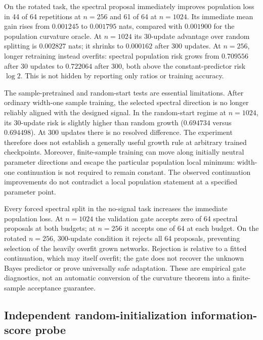 On the rotated task, the spectral proposal immediately improves population
loss in 44 of 64 repetitions at $n=256$ and 61 of 64 at $n=1024$. Its immediate
mean gain rises from $0.001245$ to $0.001795$ nats, compared with $0.001900$ for
the population curvature oracle. At $n=1024$ its 30-update advantage over random
splitting is $0.002827$ nats; it shrinks to $0.000162$ after 300 updates.
At $n=256$, longer retraining instead overfits: spectral population risk grows
from $0.709556$ after 30 updates to $0.722064$ after 300, both above the
constant-predictor risk $\log 2$. This is not hidden by reporting only ratios or
training accuracy.

The sample-pretrained and random-start tests are essential limitations.
After ordinary width-one sample training, the selected spectral direction is
no longer reliably aligned with the designed signal. In the random-start
regime at $n=1024$, its 30-update risk is slightly higher than random growth
($0.694734$ versus $0.694498$). At 300 updates there is no resolved difference.
The experiment therefore does not establish a generally useful growth rule at
arbitrary trained checkpoints. Moreover, finite-sample training can move along
initially neutral parameter directions and escape the particular population
local minimum: width-one continuation is not required to remain constant.
The observed continuation improvements do not contradict a local population
statement at a specified parameter point.

Every forced spectral split in the no-signal task increases the immediate
population loss. At $n=1024$ the validation gate accepts zero of 64 spectral
proposals at both budgets; at $n=256$ it accepts one of 64 at each budget.
On the rotated $n=256$, 300-update condition it rejects all 64 proposals,
preventing selection of the heavily overfit grown networks. Rejection is
relative to a fitted continuation, which may itself overfit; the gate does not
recover the unknown Bayes predictor or prove universally safe adaptation.
These are empirical gate diagnostics, not an automatic conversion of the
curvature theorem into a finite-sample acceptance guarantee.

\subsection{Independent random-initialization information-score probe}
\label{sec:information-probe}

